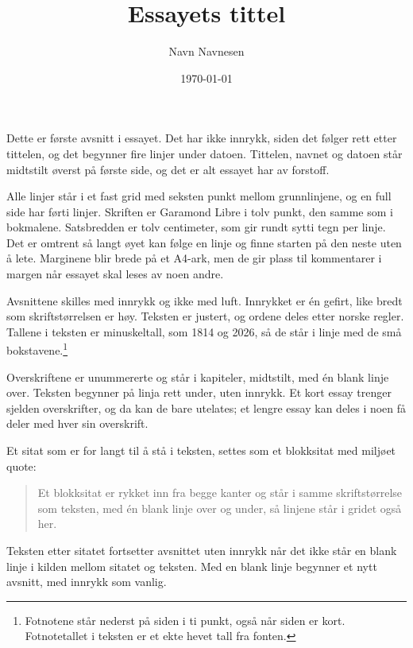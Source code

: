 \documentclass[12pt]{article}
\title{Essayets tittel}
\author{Navn Navnesen}
\date{\today}
\begin{document}
\maketitle


%

Dette er første avsnitt i essayet. Det har ikke innrykk, siden det følger rett etter tittelen, og det begynner fire linjer under datoen. Tittelen, navnet og datoen står midtstilt øverst på første side, og det er alt essayet har av forstoff.

Alle linjer står i et fast grid med seksten punkt mellom grunnlinjene, og en full side har førti linjer. Skriften er Garamond Libre i tolv punkt, den samme som i bokmalene. Satsbredden er tolv centimeter, som gir rundt sytti tegn per linje. Det er omtrent så langt øyet kan følge en linje og finne starten på den neste uten å lete. Marginene blir brede på et A4-ark, men de gir plass til kommentarer i margen når essayet skal leses av noen andre.

Avsnittene skilles med innrykk og ikke med luft. Innrykket er én gefirt, like bredt som skriftstørrelsen er høy. Teksten er justert, og ordene deles etter norske regler. Tallene i teksten er minuskeltall, som 1814 og 2026, så de står i linje med de små bokstavene.\footnote{Fotnotene står nederst på siden i ti punkt, også når siden er kort. Fotnotetallet i teksten er et ekte hevet tall fra fonten.}


Overskriftene er unummererte og står i kapiteler, midtstilt, med én blank linje over. Teksten begynner på linja rett under, uten innrykk. Et kort essay trenger sjelden overskrifter, og da kan de bare utelates; et lengre essay kan deles i noen få deler med hver sin overskrift.

Et sitat som er for langt til å stå i teksten, settes som et blokksitat med miljøet quote:

\begin{quote}
Et blokksitat er rykket inn fra begge kanter og står i samme skriftstørrelse som teksten, med én blank linje over og under, så linjene står i gridet også her.
\end{quote}
Teksten etter sitatet fortsetter avsnittet uten innrykk når det ikke står en blank linje i kilden mellom sitatet og teksten. Med en blank linje begynner et nytt avsnitt, med innrykk som vanlig.
\end{document}
